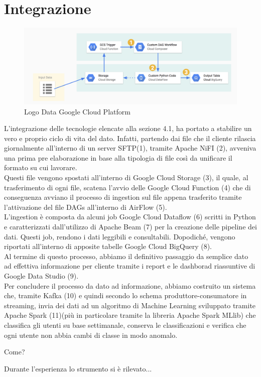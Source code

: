 \section{Integrazione}
\begin{figure}[h!]
	\centering
	\includegraphics[scale=0.5]{figures/workflow-overview}
	\caption[Short figure name.]{Logo Data Google Cloud Platform
		\label{fig:logoGCP}}
\end{figure}	
L'integrazione delle tecnologie elencate alla sezione 4.1, ha portato a stabilire un vero e proprio ciclo di vita del dato. Infatti, partendo dai file che il cliente rilascia giornalmente all'interno di un \gls{server SFTP}(1), tramite Apache NiFI (2), avveniva una prima pre elaborazione in base alla tipologia di file così da unificare il formato su cui lavorare.
\\
Questi file vengono spostati all'interno di Google Cloud Storage (3), il quale, al trasferimento di ogni file, scatena l'avvio delle Google Cloud Function (4) che di conseguenza avviano il processo di ingestion sul file appena trasferito tramite l'attivazione del file DAGs all'interno di AirFlow (5).
\\
L'ingestion è composta da alcuni job Google Cloud Dataflow (6) scritti in \gls{Python} e caratterizzati dall'utilizzo di Apache Beam (7) per la creazione delle pipeline dei dati.
Questi job, rendono i dati leggibili e consultabili. Dopodiché, vengono riportati all'interno di apposite tabelle Google Cloud BigQuery (8).
\\
Al termine di questo processo, abbiamo il definitivo passaggio da semplice dato ad effettiva informazione per cliente tramite i report e le dashborad riassuntive di Google Data Studio (9).
\\
Per concludere il processo da dato ad informazione, abbiamo costruito un sistema che, tramite Kafka (10) e quindi secondo lo schema produttore-consumatore in streaming, invia dei dati ad un algoritmo di Machine Learning sviluppato tramite Apache Spark (11)(più in particolare tramite la libreria Apache Spark MLlib) che classifica gli utenti su base settimanale, conserva le classificazioni e verifica che ogni utente non abbia cambi di classe in modo anomalo.

Come?

Durante l'esperienza lo strumento si è rilevato...